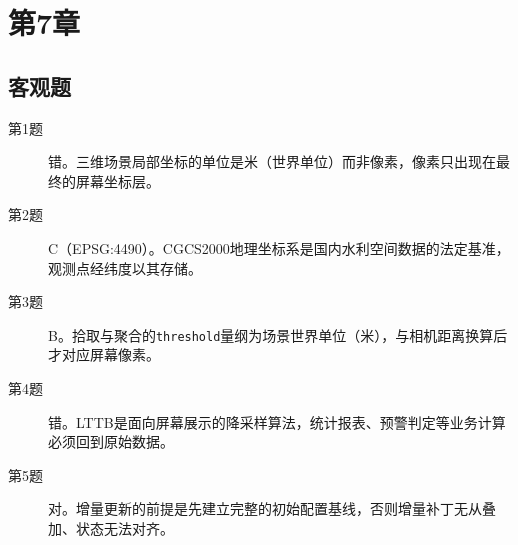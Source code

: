 \section{第7章}

\subsection*{客观题}
\begin{description}
  \item[第1题] 错。三维场景局部坐标的单位是米（世界单位）而非像素，像素只出现在最终的屏幕坐标层。
  \item[第2题] C（EPSG:4490）。CGCS2000地理坐标系是国内水利空间数据的法定基准，观测点经纬度以其存储。
  \item[第3题] B。拾取与聚合的\texttt{threshold}量纲为场景世界单位（米），与相机距离换算后才对应屏幕像素。
  \item[第4题] 错。LTTB是面向屏幕展示的降采样算法，统计报表、预警判定等业务计算必须回到原始数据。
  \item[第5题] 对。增量更新的前提是先建立完整的初始配置基线，否则增量补丁无从叠加、状态无法对齐。
\end{description}

